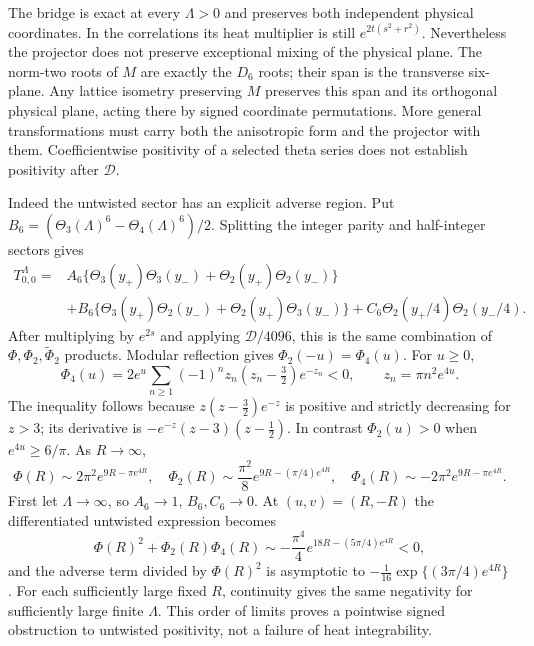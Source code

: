 \documentclass[11pt]{article}
\numberwithin{equation}{section}
\theoremstyle{definition}
\theoremstyle{remark}
\begin{document}
The bridge is exact at every \(\Lambda>0\) and preserves both
independent physical coordinates.  In the correlations its heat
multiplier is still \(e^{2t(s^2+r^2)}\).  Nevertheless the projector
does not preserve exceptional mixing of the physical plane.  The
norm-two roots of \(M\) are exactly the \(D_6\) roots; their span is
the transverse six-plane.  Any lattice isometry preserving \(M\)
preserves this span and its orthogonal physical plane, acting there
by signed coordinate permutations.  More general transformations
must carry both the anisotropic form and the projector with them.
Coefficientwise positivity of a selected theta series does not
establish positivity after \(\mathcal D\).

Indeed the untwisted sector has an explicit adverse region.  Put
\(B_6=(\Theta_3(\Lambda)^6-\Theta_4(\Lambda)^6)/2\).  Splitting the
integer parity and half-integer sectors gives
\begin{align}
 T_{0,0}^{\Lambda}={}&
 A_6\{\Theta_3(y_+)\Theta_3(y_-)+\Theta_2(y_+)\Theta_2(y_-)\}
 \nonumber\\
 &+B_6\{\Theta_3(y_+)\Theta_2(y_-)+
                    \Theta_2(y_+)\Theta_3(y_-)\}
       +C_6\Theta_2(y_+/4)\Theta_2(y_-/4).
 \label{sf:E8-untwisted}
\end{align}
After multiplying by \(e^{2s}\) and applying \(\mathcal D/4096\),
this is the same combination of \(\Phi,\Phi_2,\widetilde\Phi_2\)
products.  Modular reflection gives \(\Phi_2(-u)=\Phi_4(u)\).
For \(u\ge0\),
\[
 \Phi_4(u)=2e^u\sum_{n\ge1}(-1)^n
 z_n(z_n-\tfrac32)e^{-z_n}<0,\qquad z_n=\pi n^2e^{4u}.
\]
The inequality follows because \(z(z-\tfrac32)e^{-z}\) is positive
and strictly decreasing for \(z>3\); its derivative is
\(-e^{-z}(z-3)(z-\tfrac12)\).  In contrast \(\Phi_2(u)>0\) when
\(e^{4u}\ge6/\pi\).
As \(R\to\infty\),
\[
 \Phi(R)\sim2\pi^2e^{9R-\pi e^{4R}},\quad
 \Phi_2(R)\sim\frac{\pi^2}{8}e^{9R-(\pi/4)e^{4R}},\quad
 \Phi_4(R)\sim-2\pi^2e^{9R-\pi e^{4R}}.
\]
First let \(\Lambda\to\infty\), so \(A_6\to1\), \(B_6,C_6\to0\).
At \((u,v)=(R,-R)\) the differentiated untwisted expression becomes
\begin{equation}
 \Phi(R)^2+\Phi_2(R)\Phi_4(R)
 \sim-\frac{\pi^4}{4}e^{18R-(5\pi/4)e^{4R}}<0,
 \label{sf:E8-negative}
\end{equation}
and the adverse term divided by \(\Phi(R)^2\) is asymptotic to
\(-\frac1{16}\exp\{(3\pi/4)e^{4R}\}\).
For each sufficiently large fixed \(R\), continuity gives the same
negativity for sufficiently large finite \(\Lambda\).  This order
of limits proves a pointwise signed obstruction to untwisted
positivity, not a failure of heat integrability.
\end{document}
